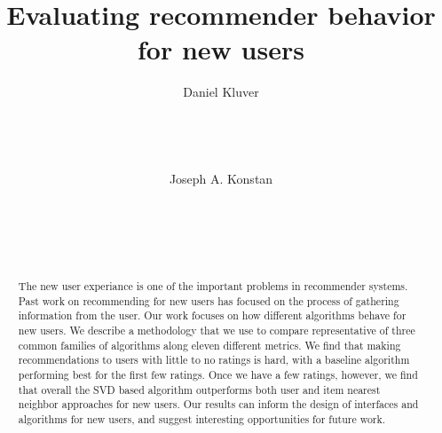 \documentclass[letterpaper]{sig-alternate}
\begin{document}

\title{Evaluating recommender behavior for new users}


\author {
\alignauthor
Daniel Kluver\\
\\
\\
\\
\\
\alignauthor
Joseph A. Konstan\\
\\
\\
\\
\\
}

\maketitle
\begin{abstract}

  The new user experiance is one of the important problems in recommender systems.
  Past work on recommending for new users has focused on the process of gathering information from the user.
  Our work focuses on how different algorithms behave for new users.
  We describe a methodology that we use to compare representative of three common families of algorithms along eleven different metrics.
  We find that making recommendations to users with little to no ratings is hard, with a baseline algorithm performing best for the first few ratings.
  Once we have a few ratings, however, we find that overall the SVD based algorithm outperforms both user and item nearest neighbor approaches for new users.
  Our results can inform the design of interfaces and algorithms for new users, and suggest interesting opportunities for future work.

\end{abstract}
\end{document}
